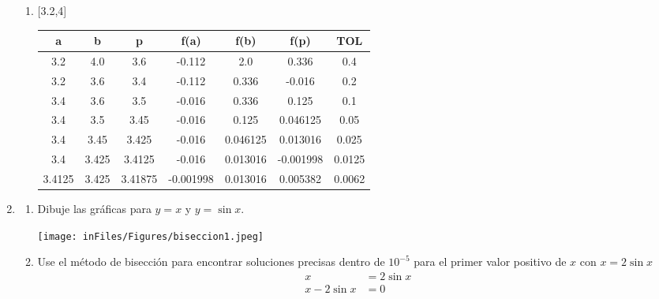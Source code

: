 \documentclass[12pt]{article}
\begin{document}
\begin{enumerate}
\begin{enumerate}[label=\alph*]
        \item {[3.2,4]}
         

           \begin{tabular}{|c|c|c|c|c|c|c|}
            \hline
            \textbf{a} & \textbf{b} & \textbf{p} & \textbf{f(a)} & \textbf{f(b)} & \textbf{f(p)} & \textbf{TOL}\\ \hline
            3.2 & 4.0 & 3.6 & -0.112 & 2.0 & 0.336 & 0.4 \\
            3.2 & 3.6 & 3.4 & -0.112 & 0.336 & -0.016 & 0.2 \\
            3.4 & 3.6 & 3.5 & -0.016 & 0.336 & 0.125 & 0.1 \\
            3.4 & 3.5 & 3.45 & -0.016 & 0.125 & 0.046125 & 0.05 \\
            3.4 & 3.45 & 3.425 & -0.016 & 0.046125 & 0.013016 & 0.025 \\
            3.4 & 3.425 & 3.4125 & -0.016 & 0.013016 & -0.001998 & 0.0125 \\
            3.4125 & 3.425 & 3.41875 & -0.001998 & 0.013016 & 0.005382 & 0.0062 \\
            \hline
            \end{tabular}
    \end{enumerate}


    \item \begin{enumerate}[label=\alph*]
        \item Dibuje las gráficas para \(y = x\) y \(y = \sin x\).
        \begin{center}
            \texttt{[image: inFiles/Figures/biseccion1.jpeg]}     
        \end{center}
        \item Use el método de bisección para encontrar soluciones precisas dentro de \(10^{-5}\) para el primer valor positivo de \( x \) con \( x = 2\sin x\) 
        \[
            \begin{aligned}
                x &= 2 \sin x\\
                x - 2 \sin x &= 0
            \end{aligned}
        \]
        

\end{enumerate}
\end{enumerate}
\end{document}
